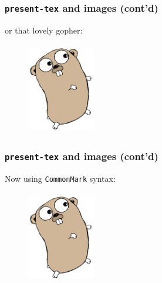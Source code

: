 \documentclass[9pt]{beamer}
\begin{document}
\begin{frame}[fragile]
\frametitle{\texttt{present-tex} and images (cont'd)}

or that lovely gopher:



\begin{figure}[h]
\begin{center}
\includegraphics[width=3cm,height=4cm]{_figs/gopher.png}
\end{center}

\end{figure}

\end{frame}

\begin{frame}[fragile]
\frametitle{\texttt{present-tex} and images (cont'd)}

Now using \texttt{CommonMark} syntax:

\begin{figure}[h]
\begin{center}
\includegraphics[width=3cm,height=4cm]{_figs/gopher.png}
\end{center}
\end{figure}




\end{frame}
\end{document}
